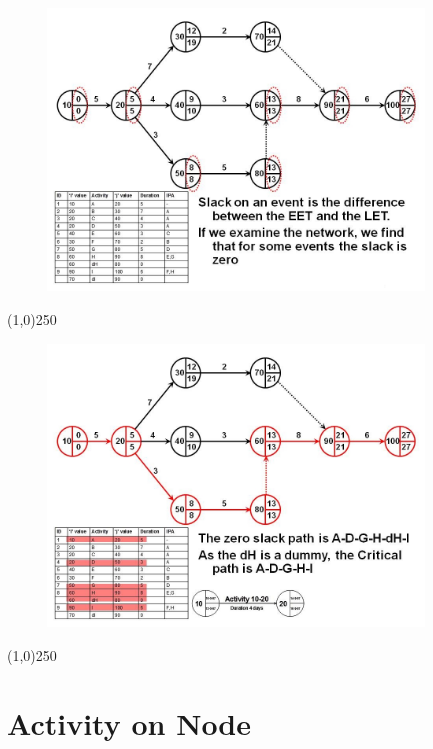 \begin{frame}
\begin{figure}
	\centering
		\includegraphics[width = 10.0cm]{oldnotes/Slide121.jpg}
\end{figure}
\end{frame}
\begin{center}\line(1,0){250}\end{center}


\begin{frame}
\begin{figure}
	\centering
		\includegraphics[width = 10.0cm]{oldnotes/Slide122.jpg}
\end{figure}
\end{frame}
\begin{center}\line(1,0){250}\end{center}



\section{Activity on Node}

